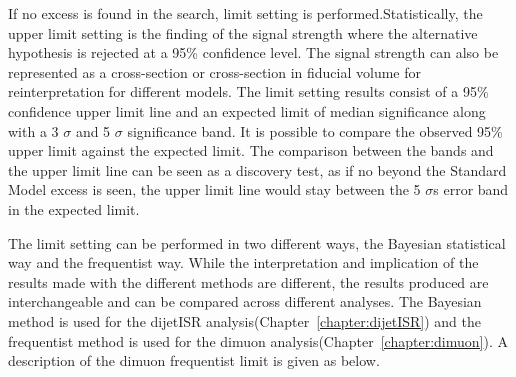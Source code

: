 If no excess is found in the search, limit setting is performed.Statistically, the upper limit setting is the finding of the signal strength where the alternative hypothesis is rejected at a 95\% confidence level. The signal strength can also be represented as a cross-section or cross-section in fiducial volume for reinterpretation for different models. 
The limit setting results consist of a 95\% confidence upper limit line and an expected limit of median significance along with a 3 $\sigma$ and 5 $\sigma$ significance band. It is possible to compare the observed 95\% upper limit against the expected limit. The comparison between the bands and the upper limit line can be seen as a discovery test, as if no beyond the Standard Model excess is seen, the upper limit line would stay between the 5 $\sigma$s error band in the expected limit. 

The limit setting can be performed in two different ways, the Bayesian statistical way and the frequentist way. While the interpretation and implication of the results made with the different methods are different, the results produced are interchangeable and can be compared across different analyses. 
The Bayesian method is used for the dijetISR analysis(Chapter~\ref{chapter:dijetISR}) and the frequentist method is used for the dimuon analysis(Chapter~\ref{chapter:dimuon}). A description of the dimuon frequentist limit is given as below. 

%



